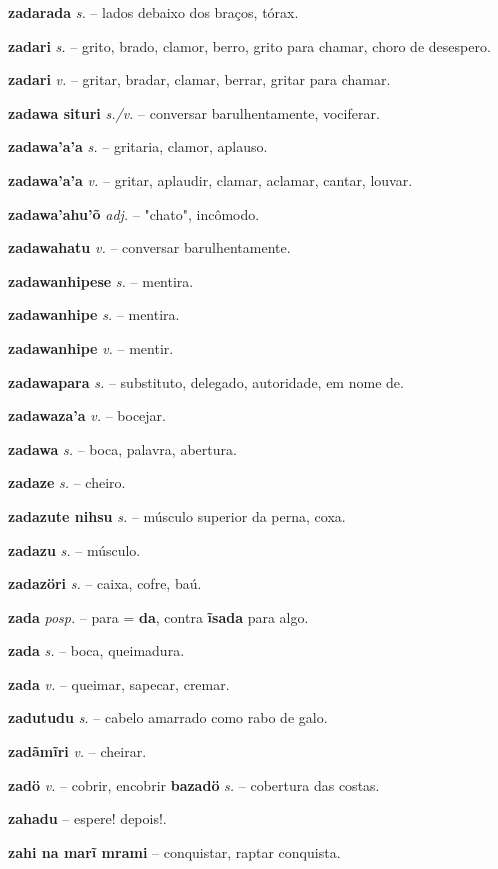 \textbf{zadarada} \textit{s.} -- lados debaixo dos braços, tórax.

\textbf{zadari} \textit{s.} -- grito, brado, clamor, berro, grito para chamar, choro de desespero.

\textbf{zadari} \textit{v.} -- gritar, bradar, clamar, berrar, gritar para chamar.

\textbf{zadawa situri} \textit{s./v.} -- conversar barulhentamente, vociferar.

\textbf{zadawa'a'a} \textit{s.} -- gritaria, clamor, aplauso.

\textbf{zadawa'a'a} \textit{v.} -- gritar, aplaudir, clamar, aclamar, cantar, louvar.

\textbf{zadawa'ahu'õ} \textit{adj.} -- "chato", incômodo.

\textbf{zadawahatu} \textit{v.} -- conversar barulhentamente.

\textbf{zadawanhipese} \textit{s.} -- mentira.

\textbf{zadawanhipe} \textit{s.} -- mentira.

\textbf{zadawanhipe} \textit{v.} -- mentir.

\textbf{zadawapara} \textit{s.} -- substituto, delegado, autoridade, em nome de.

\textbf{zadawaza'a} \textit{v.} -- bocejar.

\textbf{zadawa} \textit{s.} -- boca, palavra, abertura.

\textbf{zadaze} \textit{s.} -- cheiro.

\textbf{zadazute nihsu} \textit{s.} -- músculo superior da perna, coxa.

\textbf{zadazu} \textit{s.} -- músculo.

\textbf{zadazöri} \textit{s.} -- caixa, cofre, baú.

\textbf{zada} \textit{posp.} -- para = \textbf{da}, contra  \textbf{ĩsada} para algo.

\textbf{zada} \textit{s.} -- boca, queimadura.

\textbf{zada} \textit{v.} -- queimar, sapecar, cremar.

\textbf{zadutudu} \textit{s.} -- cabelo amarrado como rabo de galo.

\textbf{zadãmĩri} \textit{v.} -- cheirar.

\textbf{zadö} \textit{v.} -- cobrir, encobrir  \textbf{bazadö} \textit{s.} -- cobertura das costas.

\textbf{zahadu} -- espere! depois!.

\textbf{zahi na marĩ mrami} -- conquistar, raptar  conquista.

